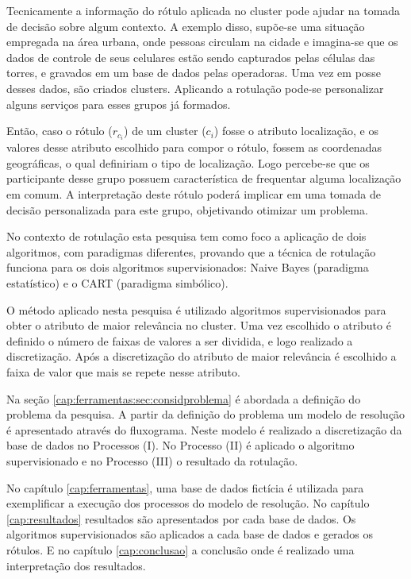 Tecnicamente a informação do rótulo aplicada no cluster pode ajudar na tomada de decisão sobre algum contexto. A exemplo disso, supõe-se uma situação empregada na área urbana, onde pessoas circulam na cidade e imagina-se que os dados de controle de seus celulares estão sendo capturados pelas células das torres, e gravados em um base de dados pelas operadoras. Uma vez em posse desses dados, são criados clusters. Aplicando a rotulação pode-se personalizar alguns serviços para esses grupos já formados. 

Então, caso o rótulo (${r_{c_i}}$) de um cluster (${c_i}$) fosse o  atributo localização, e os valores  desse atributo escolhido para compor o rótulo, fossem as coordenadas geográficas, o qual definiriam o tipo de localização. Logo percebe-se que os participante desse grupo possuem característica de frequentar alguma localização em comum. A interpretação deste rótulo poderá implicar em uma tomada de decisão personalizada para este grupo, objetivando otimizar um problema.

No contexto de rotulação esta pesquisa tem como foco a aplicação de dois algoritmos, com paradigmas diferentes, provando que a técnica de rotulação funciona para os dois  algoritmos supervisionados: Naive Bayes (paradigma estatístico) e o CART (paradigma simbólico).

O método aplicado nesta pesquisa é utilizado algoritmos supervisionados para obter o  atributo  de maior relevância no cluster. Uma vez escolhido o atributo é definido o número de faixas de valores a ser dividida, e logo realizado a discretização. Após a discretização do atributo de maior relevância é escolhido a faixa de valor que mais se repete nesse atributo. 

Na seção \ref{cap:ferramentas:sec:considproblema} é abordada a definição do problema da pesquisa. A partir da definição do problema um modelo de resolução é apresentado através do fluxograma. Neste modelo é realizado a discretização da base de dados no Processos (I). No Processo (II) é aplicado o algoritmo supervisionado e no Processo (III) o resultado da rotulação. 

No capítulo \ref{cap:ferramentas}, uma base de dados fictícia é utilizada para exemplificar a execução dos processos do modelo de resolução. 
No capítulo \ref{cap:resultados} resultados são apresentados por cada base de dados. Os algoritmos supervisionados são aplicados a cada base de dados e gerados os rótulos. 
E no capítulo \ref{cap:conclusao} a conclusão onde é realizado uma interpretação dos resultados.




